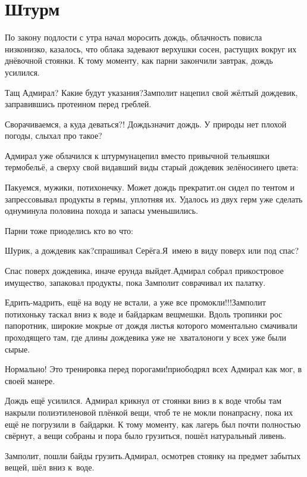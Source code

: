 \chapter{Штурм}
\vepsianrose

По закону подлости с утра начал моросить дождь, облачность повисла низко\sdash низко, казалось, что облака задевают верхушки сосен, растущих вокруг их днёвочной стоянки. К тому моменту, как парни закончили завтрак, дождь усилился.

\diagdash Тащ Адмирал? Какие будут указания?\mdash Замполит нацепил свой жёлтый дождевик, заправившись протеином перед греблей.

\diagdash Сворачиваемся, а куда деваться?! Дождь\mdash значит дождь. У природы нет плохой погоды, слыхал про такое?

Адмирал уже облачился к штурму\mdash нацепил вместо привычной тельняшки термобельё, а сверху свой видавший виды старый дождевик зелёно\sdash синего цвета:

\diagdash Пакуемся, мужики, потихонечку. Может дождь прекратит.\mdash он сидел по тентом и запрессовывал продукты в гермы, уплотняя их. Удалось из двух герм уже сделать одну\mdash минула половина похода и запасы уменьшились.

Парни тоже приоделись кто во что: 

\diagdash Шурик, а дождевик как?\mdash спрашивал Серёга.\mdash Я~имею в виду поверх или под спас?

\diagdash Спас поверх дождевика, иначе ерунда выйдет.\mdash Адмирал собрал прикостровое имущество, запаковал продукты, пока Замполит соврачивал их палатку.

\diagdash Едрить-мадрить, ещё на воду не встали, а уже все промокли!!!\mdash Замполит потихоньку таскал вниз к воде и байдаркам вещмешки. Вдоль тропинки рос папоротник, широкие мокрые от дождя листья которого моментально смачивали проходящего там, где длины дождевика уже не~хватало\mdash ноги у всех уже были сырые.

\diagdash Нормально! Это тренировка перед порогами!\mdash приободрял всех Адмирал как мог, в своей манере.

Дождь ещё усилился. Адмирал крикнул от стоянки вниз в к воде чтобы там накрыли полиэтиленовой плёнкой вещи, чтоб те не мокли понапрасну, пока их ещё не погрузили в~байдарки. К тому моменту, как лагерь был почти полностью свёрнут, а вещи собраны и пора было грузиться, пошёл натуральный ливень.

\diagdash Замполит, пошли байды грузить.\mdash Адмирал, осмотрев стоянку на предмет забытых вещей, шёл вниз к~воде.


